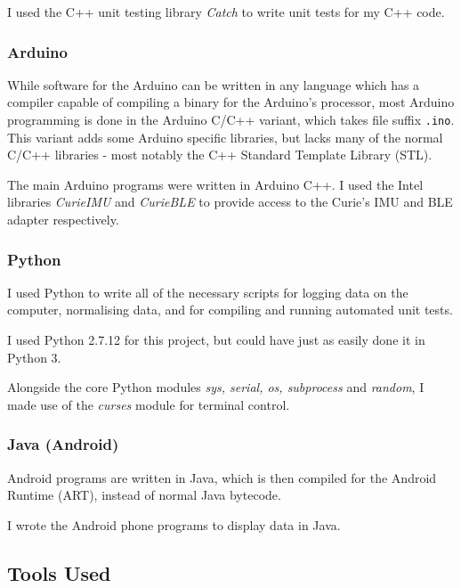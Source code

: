 \documentclass[a4paper]{article}
\begin{document}
I used the C++ unit testing library \textit{Catch}\cite{ppref6} to write unit tests for my C++ code.

\subsubsection{Arduino}

While software for the Arduino can be written in any language which has a compiler capable of compiling a binary for the Arduino's processor, most Arduino programming is done in the Arduino C/C++ variant\cite{ppref7}, which takes file suffix \lstinline{.ino}. This variant adds some Arduino specific libraries\cite{ppref8}, but lacks many of the normal C/C++ libraries - most notably the C++ Standard Template Library (STL).\cite{ppref9}

The main Arduino programs were written in Arduino C++. I used the Intel libraries \textit{CurieIMU}\cite{ppref10} and \textit{CurieBLE}\cite{ppref11} to provide access to the Curie's IMU and BLE adapter respectively.

\subsubsection{Python}

I used Python\cite{ppref12} to write all of the necessary scripts for logging data on the computer, normalising data, and for compiling and running automated unit tests.

I used Python 2.7.12 for this project, but could have just as easily done it in Python 3.

Alongside the core Python modules \textit{sys, serial, os, subprocess} and \textit{random}, I made use of the \textit{curses}\cite{ppref13} module for terminal control.

\subsubsection{Java (Android)}

Android\cite{ppref14} programs are written in Java, which is then compiled for the Android Runtime (ART)\cite{ppref15}, instead of normal Java bytecode.

I wrote the Android phone programs to display data in Java.

\subsection{Tools Used}%
\end{document}
